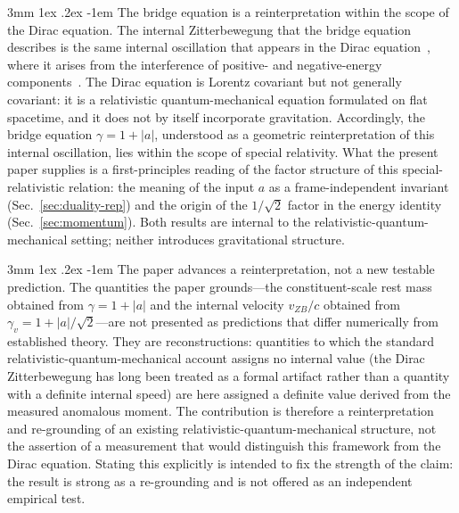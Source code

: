 \documentclass[%
 reprint, amsmath,amssymb, aps, prb, ]{revtex4-2}
\makeatletter
\numberwithin{equation}{section}
\renewcommand\paragraph{%
  \@startsection{paragraph}{4}{\z@}%
    {3mm \@plus 1ex \@minus .2ex}%
    {-1em}%
    {\normalfont\normalsize\itshape}}
\makeatother
\begin{document}
\paragraph{The bridge equation is a reinterpretation within the scope of the Dirac equation.}
The internal Zitterbewegung that the bridge equation describes is the same internal oscillation that appears in the Dirac equation~\cite{dirac1928}, where it arises from the interference of positive- and negative-energy components~\cite{schrodinger1930}. The Dirac equation is Lorentz covariant but not generally covariant: it is a relativistic quantum-mechanical equation formulated on flat spacetime, and it does not by itself incorporate gravitation. Accordingly, the bridge equation $\gamma = 1 + \lvert a\rvert$, understood as a geometric reinterpretation of this internal oscillation, lies within the scope of special relativity. What the present paper supplies is a first-principles reading of the factor structure of this special-relativistic relation: the meaning of the input $a$ as a frame-independent invariant (Sec.~\ref{sec:duality-rep}) and the origin of the $1/\sqrt{2}$ factor in the energy identity (Sec.~\ref{sec:momentum}). Both results are internal to the relativistic-quantum-mechanical setting; neither introduces gravitational structure.

\paragraph{The paper advances a reinterpretation, not a new testable prediction.}
The quantities the paper grounds---the constituent-scale rest mass obtained from $\gamma = 1 + \lvert a\rvert$ and the internal velocity $v_{ZB}/c$ obtained from $\gamma_v = 1 + \lvert a\rvert/\sqrt{2}$---are not presented as predictions that differ numerically from established theory. They are reconstructions: quantities to which the standard relativistic-quantum-mechanical account assigns no internal value (the Dirac Zitterbewegung has long been treated as a formal artifact rather than a quantity with a definite internal speed) are here assigned a definite value derived from the measured anomalous moment. The contribution is therefore a reinterpretation and re-grounding of an existing relativistic-quantum-mechanical structure, not the assertion of a measurement that would distinguish this framework from the Dirac equation. Stating this explicitly is intended to fix the strength of the claim: the result is strong as a re-grounding and is not offered as an independent empirical test.
\end{document}
